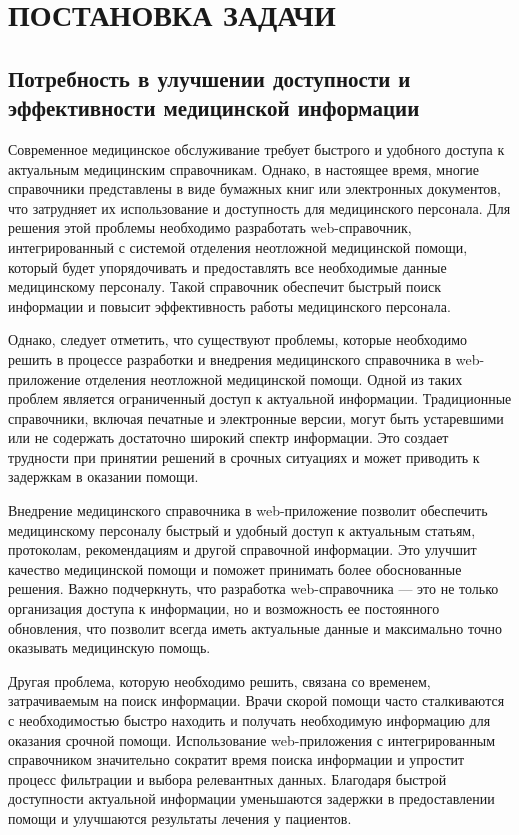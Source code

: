 \section{ПОСТАНОВКА ЗАДАЧИ}

\subsection{Потребность в улучшении доступности и эффективности медицинской информации}

Современное медицинское обслуживание требует быстрого и удобного доступа к актуальным медицинским справочникам. Однако, в настоящее время, многие справочники представлены в виде бумажных книг или электронных документов, что затрудняет их использование и доступность для медицинского персонала. Для решения этой проблемы необходимо разработать web-справочник, интегрированный с системой отделения неотложной медицинской помощи, который будет упорядочивать и предоставлять все необходимые данные медицинскому персоналу. Такой справочник обеспечит быстрый поиск информации и повысит эффективность работы медицинского персонала.

Однако, следует отметить, что существуют проблемы, которые необходимо решить в процессе разработки и внедрения медицинского справочника в web-приложение отделения неотложной медицинской помощи. Одной из таких проблем является ограниченный доступ к актуальной информации. Традиционные справочники, включая печатные и электронные версии, могут быть устаревшими или не содержать достаточно широкий спектр информации. Это создает трудности при принятии решений в срочных ситуациях и может приводить к задержкам в оказании помощи.

Внедрение медицинского справочника в web-приложение позволит обеспечить медицинскому персоналу быстрый и удобный доступ к актуальным статьям, протоколам, рекомендациям и другой справочной информации. Это улучшит качество медицинской помощи и поможет принимать более обоснованные решения. Важно подчеркнуть, что разработка web-справочника — это не только организация доступа к информации, но и возможность ее постоянного обновления, что позволит всегда иметь актуальные данные и максимально точно оказывать медицинскую помощь.

Другая проблема, которую необходимо решить, связана со временем, затрачиваемым на поиск информации. Врачи скорой помощи часто сталкиваются с необходимостью быстро находить и получать необходимую информацию для оказания срочной помощи. Использование web-приложения с интегрированным справочником значительно сократит время поиска информации и упростит процесс фильтрации и выбора релевантных данных. Благодаря быстрой доступности актуальной информации уменьшаются задержки в предоставлении помощи и улучшаются результаты лечения у пациентов.

